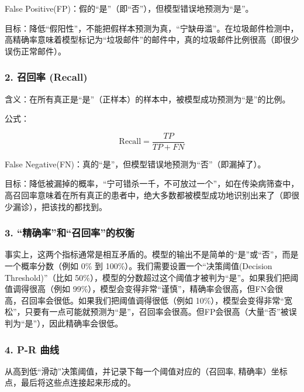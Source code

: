 False Positive(FP)：假的``是''（即``否''），但模型错误地预测为``是''。

目标：降低``假阳性''，不能把假样本预测为真，``宁缺毋滥''。在垃圾邮件检测中，高精确率意味着模型标记为``垃圾邮件''的邮件中，真的垃圾邮件比例很高（即很少误伤正常邮件）。

\hypertarget{ux53ecux56deux7387-recall}{%
\subsubsection{2. 召回率 (Recall)}\label{ux53ecux56deux7387-recall}}

含义：在所有真正是``是''（正样本）的样本中，被模型成功预测为``是''的比例。

公式：

\[
\mathrm{Recall}=\frac{TP}{TP+FN}
\]

False Negative(FN)：真的``是''，但模型错误地预测为``否''（即漏掉了）。

目标：降低被漏掉的概率，``宁可错杀一千，不可放过一个''，如在传染病筛查中，高召回率意味着在所有真正的患者中，绝大多数都被模型成功地识别出来了（即很少漏诊），把该找的都找到。

\hypertarget{ux7cbeux786eux7387ux548cux53ecux56deux7387ux7684ux6743ux8861}{%
\subsubsection{3. ``精确率''和``召回率''的权衡}\label{ux7cbeux786eux7387ux548cux53ecux56deux7387ux7684ux6743ux8861}}

事实上，这两个指标通常是相互矛盾的。模型的输出不是简单的``是''或``否''，而是一个概率分数（例如 0\% 到 100\%）。我们需要设置一个``决策阈值(Decision Threshold)''（比如 50\%），模型的分数超过这个阈值才被判为``是''。如果我们把阈值调得很高（例如 99\%），模型会变得非常``谨慎''，精确率会很高，但FN会很高，召回率会很低。如果我们把阈值调得很低（例如 10\%），模型会变得非常``宽松''，只要有一点可能就预测为``是''，召回率会很高。但FP会很高（大量``否''被误判为``是''），因此精确率会很低。

\hypertarget{p-r-ux66f2ux7ebf}{%
\subsubsection{4. P-R 曲线}\label{p-r-ux66f2ux7ebf}}

从高到低``滑动''决策阈值，并记录下每一个阈值对应的（召回率, 精确率）坐标点，最后将这些点连接起来形成的。

